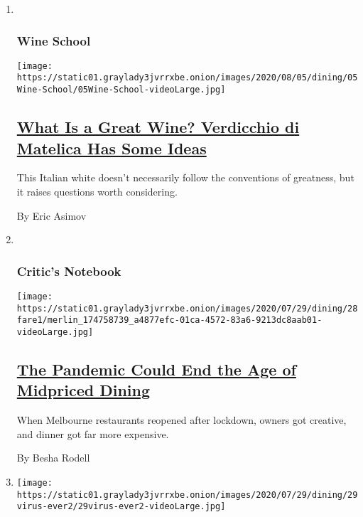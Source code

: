 \begin{enumerate}
\def\labelenumi{\arabic{enumi}.}
\item ~
  \hypertarget{wine-school}{%
  \subsubsection{Wine School}\label{wine-school}}

  \texttt{[image: https://static01.graylady3jvrrxbe.onion/images/2020/08/05/dining/05Wine-School/05Wine-School-videoLarge.jpg]}

  \hypertarget{what-is-a-great-wine-verdicchio-di-matelica-has-some-ideas}{%
  \subsection{\texorpdfstring{\href{/2020/07/30/dining/drinks/wine-school-verdicchio-di-matelica.html}{What
  Is a Great Wine? Verdicchio di Matelica Has Some
  Ideas}}{What Is a Great Wine? Verdicchio di Matelica Has Some Ideas}}\label{what-is-a-great-wine-verdicchio-di-matelica-has-some-ideas}}

  This Italian white doesn't necessarily follow the conventions of
  greatness, but it raises questions worth considering.

  By Eric Asimov
\item ~
  \hypertarget{critics-notebook-1}{%
  \subsubsection{Critic's Notebook}\label{critics-notebook-1}}

  \texttt{[image: https://static01.graylady3jvrrxbe.onion/images/2020/07/29/dining/28fare1/merlin\_174758739\_a4877efc-01ca-4572-83a6-9213dc8aab01-videoLarge.jpg]}

  \hypertarget{the-pandemic-could-end-the-age-of-midpriced-dining}{%
  \subsection{\texorpdfstring{\href{/2020/07/28/dining/melbourne-restaurants-coronavirus.html}{The
  Pandemic Could End the Age of Midpriced
  Dining}}{The Pandemic Could End the Age of Midpriced Dining}}\label{the-pandemic-could-end-the-age-of-midpriced-dining}}

  When Melbourne restaurants reopened after lockdown, owners got
  creative, and dinner got far more expensive.

  By Besha Rodell
\item
  \texttt{[image: https://static01.graylady3jvrrxbe.onion/images/2020/07/29/dining/29virus-ever2/29virus-ever2-videoLarge.jpg]}


\end{enumerate}

